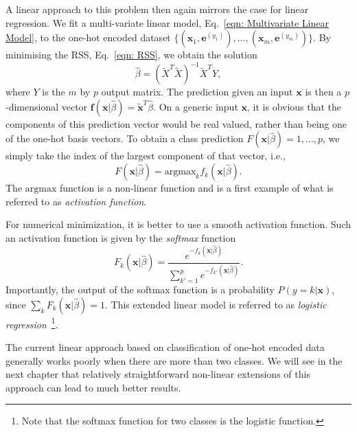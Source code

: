 A linear approach to this problem then again mirrors the case for linear regression.
We fit a multi-variate linear model, Eq.~\eqref{eqn: Multivariate Linear Model}, to the one-hot encoded dataset \allowbreak$\lbrace(\bm{x}_{1}, \bm{e}^{(y_1)}), \dots, (\bm{x}_{m}, \bm{e}^{(y_m)})\rbrace$. By minimising the RSS, Eq.~\eqref{eqn: RSS}, we obtain the solution
\begin{equation}
    \hat{\beta} = (\widetilde{X}^{T}\widetilde{X})^{-1} \widetilde{X}^{T} Y,
\end{equation}
where $Y$ is the $m$ by $p$ output matrix. The prediction given an input $\bm{x}$ is then a $p$-dimensional vector $\bm{f}(\bm{x}|\hat{\beta}) = \tilde{\bm{x}}^{T} \hat{\beta}$. On a generic input $\bm{x}$, it is obvious that the components of this prediction vector would be real valued, rather than being one of the one-hot basis vectors. To obtain a class prediction $F(\bm{x}|\hat{\beta}) = 1, \dots, p$, we simply take the index of the largest component of that vector, i.e.,
\begin{equation}
    F(\bm{x}|\hat{\beta}) = \textrm{argmax}_{k} f_{k}(\bm{x}|\hat{\beta}).
\end{equation}
The $\textrm{argmax}$ function is a non-linear function and is a first example of what is referred to as \emph{activation function}. 

For numerical minimization, it is better to use a smooth activation function. Such an activation function is given by the \emph{softmax} function
\begin{equation}
  F_k(\bm{x}|\hat{\beta})= \frac{e^{-f_k(\bm{x}|\hat{\beta})}}{\sum_{k'=1}^pe^{-f_{k'}(\bm{x}|\hat{\beta})}}.
\end{equation}
Importantly, the output of the softmax function is a probability $P(y = k|\bm{x})$, since $\sum_k F_k(\bm{x}|\hat{\beta}) = 1$.
This extended linear model is referred to as \emph{logistic regression}~\footnote{Note that the softmax function for two classes is the logistic function.}.

The current linear approach based on classification of one-hot encoded data generally works poorly when there are more than two classes. We will see in the next chapter that relatively straightforward non-linear extensions of this approach can lead to much better results.
